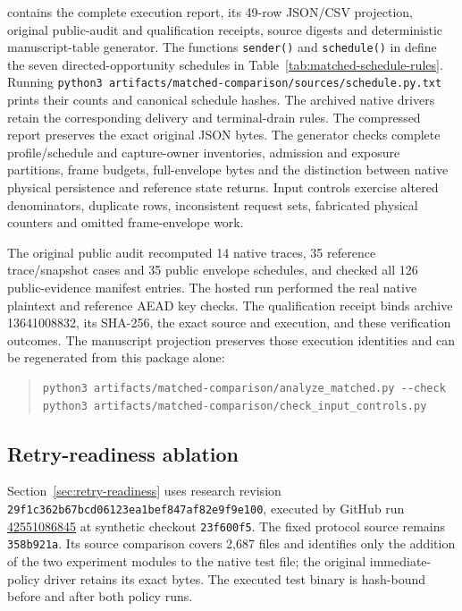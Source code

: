 \documentclass[pdflatex]{sn-jnl}
\theoremstyle{thmstyleone}
\theoremstyle{thmstylethree}
\theoremstyle{thmstyletwo}
\begin{document}
 contains the complete execution report,
its 49-row JSON/CSV projection, original public-audit and qualification
receipts, source digests and deterministic manuscript-table generator.
The functions \texttt{sender()} and \texttt{schedule()} in
 define the
seven directed-opportunity schedules in
Table~\ref{tab:matched-schedule-rules}. Running
\texttt{python3 artifacts/matched-comparison/sources/schedule.py.txt}
prints their counts and canonical schedule hashes. The archived native
drivers retain the corresponding delivery and terminal-drain rules.
The compressed report preserves the exact original JSON bytes. The generator
checks complete profile/schedule and capture-owner inventories, admission and
exposure partitions, frame budgets, full-envelope bytes and the distinction
between native physical persistence and reference state returns. Input
controls exercise altered denominators, duplicate rows, inconsistent request
sets, fabricated physical counters and omitted frame-envelope work.

The original public audit recomputed 14 native traces, 35 reference
trace/snapshot cases and 35 public envelope schedules, and checked all 126
public-evidence manifest entries. The hosted run performed the real native
plaintext and reference AEAD key checks. The qualification receipt
binds archive 13641008832, its SHA-256, the exact source and execution, and
these verification outcomes. The manuscript projection preserves those
execution identities and can be regenerated from this package alone:
\begin{samepage}
\begin{quote}
\small
\begin{verbatim}
python3 artifacts/matched-comparison/analyze_matched.py --check
python3 artifacts/matched-comparison/check_input_controls.py
\end{verbatim}
\end{quote}
\end{samepage}

\subsection{Retry-readiness ablation}
\label{app:retry-readiness}

Section~\ref{sec:retry-readiness} uses research revision
\texttt{29f1c362b67bcd06123ea1bef847af82e9f9e100}, executed by GitHub run
\href{https://github.com/billlza/q-periapt/actions/runs/42551086845}{42551086845}
at synthetic checkout \texttt{23f600f5}. The fixed protocol source remains
\texttt{358b921a}. Its source comparison covers 2,687 files and identifies
only the addition of the two experiment modules to the native test file;
the original immediate-policy driver retains its exact bytes. The executed
test binary is hash-bound before and after both policy runs.
\end{document}
